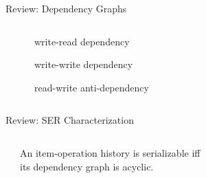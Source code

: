 \begin{frame}{Review: Dependency Graphs}
  \begin{columns}[c,onlytextwidth]
      \begin{center}
         \\[.5em]
      \end{center}
    \begin{center}
    \end{center}
    \begin{description}
      \small
      \item[$\WR$] write-read dependency
      \item[$\WW$] write-write dependency
      \item[$\RW$] read-write anti-dependency
    \end{description}
  \end{columns}
\end{frame}

\begin{frame}{Review: SER Characterization}
  \begin{columns}[c,onlytextwidth]
      \begin{center}
         \\[.5em]
         \\[1em]
         \\[.5em]
      \end{center}
    \begin{center}
      \begin{theorem}
        An item-operation history is serializable iff\\
        its dependency graph is acyclic.
      \end{theorem}
    \end{center}
  \end{columns}
\end{frame}

